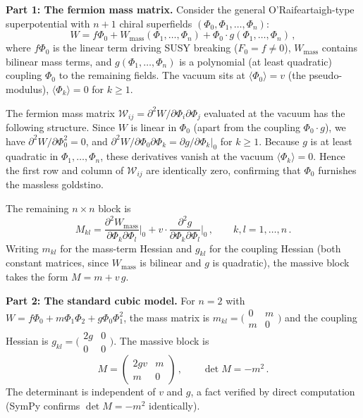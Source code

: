 
\textbf{Part 1: The fermion mass matrix.}
Consider the general O'Raifeartaigh-type superpotential with $n+1$ chiral superfields
$(\Phi_0, \Phi_1, \ldots, \Phi_n)$:
$$
W = f\Phi_0 + W_{\mathrm{mass}}(\Phi_1,\ldots,\Phi_n) + \Phi_0 \cdot g(\Phi_1,\ldots,\Phi_n)\,,
$$
where $f\Phi_0$ is the linear term driving SUSY breaking ($F_0 = f \neq 0$),
$W_{\mathrm{mass}}$ contains bilinear mass terms, and $g(\Phi_1,\ldots,\Phi_n)$
is a polynomial (at least quadratic) coupling $\Phi_0$ to the remaining fields.
The vacuum sits at $\langle\Phi_0\rangle = v$ (the pseudo-modulus),
$\langle\Phi_k\rangle = 0$ for $k \geq 1$.

The fermion mass matrix $\mathcal{W}_{ij} = \partial^2 W / \partial\Phi_i\partial\Phi_j$
evaluated at the vacuum has the following structure. Since $W$ is linear in $\Phi_0$
(apart from the coupling $\Phi_0 \cdot g$), we have
$\partial^2 W / \partial\Phi_0^2 = 0$, and
$\partial^2 W / \partial\Phi_0\partial\Phi_k = \partial g/\partial\Phi_k\big|_0$
for $k \geq 1$. Because $g$ is at least quadratic in $\Phi_1,\ldots,\Phi_n$,
these derivatives vanish at the vacuum $\langle\Phi_k\rangle = 0$. Hence the
first row and column of $\mathcal{W}_{ij}$ are identically zero, confirming
that $\Phi_0$ furnishes the massless goldstino.

The remaining $n \times n$ block is
$$
M_{kl} = \frac{\partial^2 W_{\mathrm{mass}}}{\partial\Phi_k\partial\Phi_l}\bigg|_0
+ v \cdot \frac{\partial^2 g}{\partial\Phi_k\partial\Phi_l}\bigg|_0\,,
\qquad k,l = 1,\ldots,n\,.
$$
Writing $m_{kl}$ for the mass-term Hessian and $g_{kl}$ for the coupling Hessian
(both constant matrices, since $W_{\mathrm{mass}}$ is bilinear and $g$ is quadratic),
the massive block takes the form $M = m + v\,g$.

\bigskip
\textbf{Part 2: The standard cubic model.}
For $n = 2$ with $W = f\Phi_0 + m\Phi_1\Phi_2 + g\Phi_0\Phi_1^2$, the mass
matrix is $m_{kl} = \bigl(\begin{smallmatrix} 0 & m \\ m & 0 \end{smallmatrix}\bigr)$
and the coupling Hessian is $g_{kl} = \bigl(\begin{smallmatrix} 2g & 0 \\ 0 & 0 \end{smallmatrix}\bigr)$.
The massive block is
$$
M = \begin{pmatrix} 2gv & m \\ m & 0 \end{pmatrix}\,,
\qquad \det M = -m^2\,.
$$
The determinant is independent of $v$ and $g$, a fact verified by direct
computation (SymPy confirms $\det M = -m^2$ identically).

